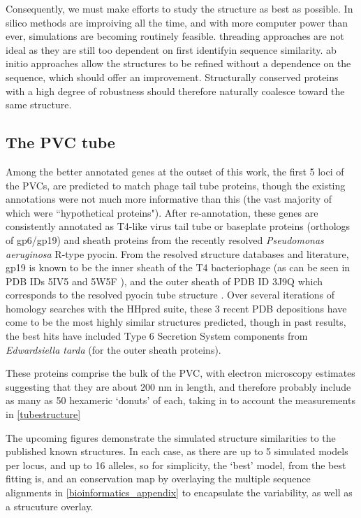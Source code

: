 Consequently, we must make efforts to study the structure as best as possible. In silico methods are improiving all the time, and with more computer power than ever, simulations are becoming routinely feasible. threading approaches are not ideal as they are still too dependent on first identifyin sequence similarity. ab initio approaches allow the structures to be refined without a dependence on the sequence, which should offer an improvement. Structurally conserved proteins with a high degree of robustness should therefore naturally coalesce toward the same structure.

\subsection{The PVC tube}
Among the better annotated genes at the outset of this work, the first 5 loci of the PVCs, are predicted to match phage tail tube proteins, though the existing annotations were not much more informative than this (the vast majority of which were ``hypothetical proteins"). After re-annotation, these genes are consistently annotated as T4-like virus tail tube or baseplate proteins (orthologs of gp6/gp19) and sheath proteins from the recently resolved \emph{Pseudomonas aeruginosa} R-type pyocin. From the resolved structure databases and literature, gp19 is known to be the inner sheath of the T4 bacteriophage (as can be seen in PDB IDs 5IV5 and 5W5F \citep{Taylor2016, Zheng2017}), and the outer sheath of PDB ID 3J9Q which corresponds to the resolved pyocin tube structure \citep{Ge2015a}. Over several iterations of homology searches with the HHpred suite, these 3 recent PDB depositions have come to be the most highly similar structures predicted, though in past results, the best hits have included Type 6 Secretion System components from \emph{Edwardsiella tarda} (for the outer sheath proteins).

These proteins comprise the bulk of the PVC, with electron microscopy estimates suggesting that they are about 200 nm in length, and therefore probably include as many as 50 hexameric `donuts' of each, taking in to account the measurements in \vref{tubestructure}


The upcoming figures demonstrate the simulated structure similarities to the published known structures. In each case, as there are up to 5 simulated models per locus, and up to 16 alleles, so for simplicity, the `best' model, from the best fitting is, and an conservation map by overlaying the multiple sequence alignments in \ref{bioinformatics_appendix}  to encapsulate the variability, as well as a strucuture overlay.

